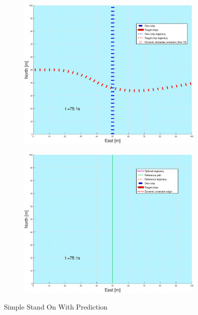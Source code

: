 \begin{figure}[ht]
\begin{subfigure}[b]{0.499\textwidth}
    \end{subfigure}
    \hfill
    \\
    \begin{subfigure}[b]{0.49\textwidth}
        \centering
        \includegraphics[width=\textwidth]{Images/Figures/enkel_SO/_Simple_0fig1_time=75}
    \end{subfigure}
    \hfill
    \begin{subfigure}[b]{0.499\textwidth}
        \centering
        \includegraphics[width=\textwidth]{Images/Figures/enkel_SO/_Simple_0fig999_time=75}
    \end{subfigure}
    \hfill
    \caption{Simple Stand On With Prediction}
\end{figure}

